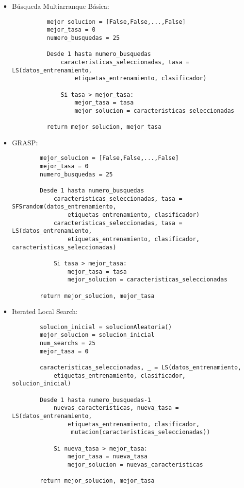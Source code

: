 \documentclass[a4paper, 11pt]{article}
\begin{document}
    \begin{itemize}
      \item Búsqueda Multiarranque Básica:
        \begin{verbatim}
          mejor_solucion = [False,False,...,False]
          mejor_tasa = 0
          numero_busquedas = 25

          Desde 1 hasta numero_busquedas
              caracteristicas_seleccionadas, tasa = LS(datos_entrenamiento,
                  etiquetas_entrenamiento, clasificador)

              Si tasa > mejor_tasa:
                  mejor_tasa = tasa
                  mejor_solucion = caracteristicas_seleccionadas

          return mejor_solucion, mejor_tasa
        \end{verbatim}
      \item GRASP:
      \begin{verbatim}
        mejor_solucion = [False,False,...,False]
        mejor_tasa = 0
        numero_busquedas = 25

        Desde 1 hasta numero_busquedas
            caracteristicas_seleccionadas, tasa = SFSrandom(datos_entrenamiento,
                etiquetas_entrenamiento, clasificador)
            caracteristicas_seleccionadas, tasa = LS(datos_entrenamiento,
                etiquetas_entrenamiento, clasificador, caracteristicas_seleccionadas)

            Si tasa > mejor_tasa:
                mejor_tasa = tasa
                mejor_solucion = caracteristicas_seleccionadas

        return mejor_solucion, mejor_tasa
      \end{verbatim}
      \item Iterated Local Search:
      \begin{verbatim}
        solucion_inicial = solucionAleatoria()
        mejor_solucion = solucion_inicial
        num_searchs = 25
        mejor_tasa = 0

        caracteristicas_seleccionadas, _ = LS(datos_entrenamiento,
            etiquetas_entrenamiento, clasificador, solucion_inicial)

        Desde 1 hasta numero_busquedas-1
            nuevas_caracteristicas, nueva_tasa = LS(datos_entrenamiento,
                etiquetas_entrenamiento, clasificador,
                 mutacion(caracteristicas_seleccionadas))

            Si nueva_tasa > mejor_tasa:
                mejor_tasa = nueva_tasa
                mejor_solucion = nuevas_caracteristicas

        return mejor_solucion, mejor_tasa
      \end{verbatim}
    \end{itemize}
\end{document}
